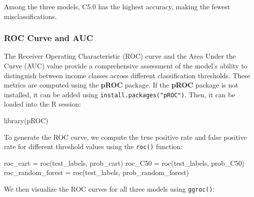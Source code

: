 \documentclass[
  11pt,
]{book}
\makeatletter
\newenvironment{Shaded}{}{}
\newcommand{\FunctionTok}[1]{#1}
\newcommand{\NormalTok}[1]{#1}
\newcommand{\OtherTok}[1]{\textcolor[rgb]{0.39,0.39,0.39}{#1}}
\newenvironment{kframe}{%
\medskip{}
\setlength{\fboxsep}{.8em}
 \def\at@end@of@kframe{}%
 \ifinner\ifhmode%
  \def\at@end@of@kframe{\end{minipage}}%
  \begin{minipage}{\columnwidth}%
 \fi\fi%
 \def\FrameCommand##1{\hskip\@totalleftmargin \hskip-\fboxsep
 \colorbox{shadecolor}{##1}\hskip-\fboxsep
     \hskip-\linewidth \hskip-\@totalleftmargin \hskip\columnwidth}%
 \MakeFramed {\advance\hsize-\width
   \@totalleftmargin\z@ \linewidth\hsize
   \@setminipage}}%
 {\par\unskip\endMakeFramed%
 \at@end@of@kframe}
\renewenvironment{Shaded}{\begin{kframe}}{\end{kframe}}
\theoremstyle{definition}
\theoremstyle{definition}
\theoremstyle{definition}
\theoremstyle{definition}
\theoremstyle{remark}
\makeatother
\begin{document}
Among the three models, C5.0 has the highest accuracy, making the fewest misclassifications.

\subsubsection*{ROC Curve and AUC}\label{roc-curve-and-auc-2}


The Receiver Operating Characteristic (ROC) curve and the Area Under the Curve (AUC) value provide a comprehensive assessment of the model's ability to distinguish between income classes across different classification thresholds. These metrics are computed using the \textbf{pROC} package. If the \textbf{pROC} package is not installed, it can be added using \texttt{install.packages("pROC")}. Then, it can be loaded into the R session:

\begin{Shaded}
\begin{Highlighting}[]
\FunctionTok{library}\NormalTok{(pROC)}
\end{Highlighting}
\end{Shaded}

To generate the ROC curve, we compute the true positive rate and false positive rate for different threshold values using the \texttt{roc()} function:

\begin{Shaded}
\begin{Highlighting}[]
\NormalTok{roc\_cart }\OtherTok{=} \FunctionTok{roc}\NormalTok{(test\_labels, prob\_cart)}
\NormalTok{roc\_C50 }\OtherTok{=} \FunctionTok{roc}\NormalTok{(test\_labels, prob\_C50)}
\NormalTok{roc\_random\_forest }\OtherTok{=} \FunctionTok{roc}\NormalTok{(test\_labels, prob\_random\_forest)}
\end{Highlighting}
\end{Shaded}

We then visualize the ROC curves for all three models using \texttt{ggroc()}:
\end{document}
